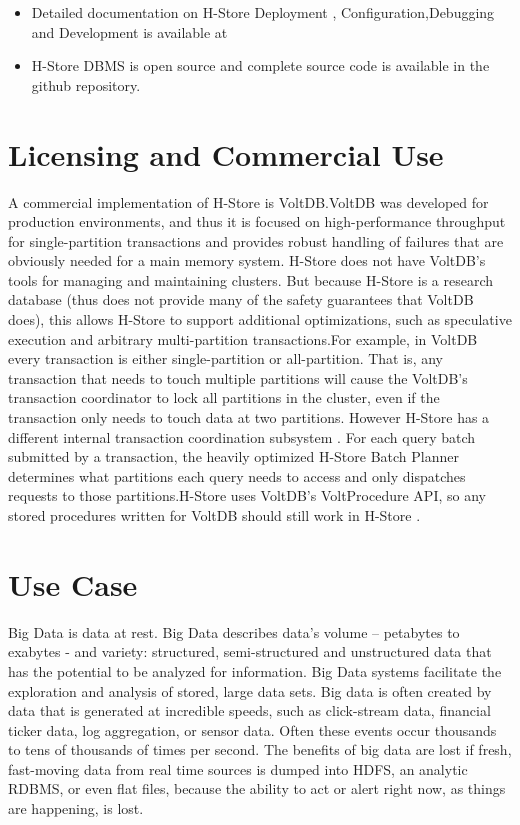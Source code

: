 \documentclass[9pt,twocolumn,twoside]{../../styles/osajnl}
\begin{document}
\begin{itemize}
\renewcommand{\labelitemi}{\scriptsize$\bullet$} 
\item Detailed documentation on H-Store  Deployment , Configuration,Debugging and Development is available at  \cite{www-H-Store}
\item H-Store DBMS is open source and complete source code is available in the  \cite{github-H-Store} github repository. 
\end{itemize}

\section{Licensing and Commercial Use}

A commercial implementation of H-Store is VoltDB.VoltDB was developed for production environments, and thus it is focused on high-performance throughput for single-partition transactions and provides robust handling of failures that are obviously needed for a main memory system. H-Store does not have VoltDB’s tools for managing and maintaining clusters. But because H-Store is a research database (thus does not provide many of the safety guarantees that VoltDB does), this allows H-Store to support additional optimizations, such as speculative execution and arbitrary multi-partition transactions.For example, in VoltDB every transaction is either single-partition or all-partition. That is, any transaction that needs to touch multiple partitions will cause the VoltDB’s transaction coordinator to lock all partitions in the cluster, even if the transaction only needs to touch data at two partitions. However H-Store has a different internal transaction coordination subsystem . For each query batch submitted by a transaction, the heavily optimized H-Store Batch Planner determines what partitions each query needs to access and only dispatches requests to those partitions.H-Store uses VoltDB’s VoltProcedure API, so any stored procedures written for VoltDB should still work in H-Store \cite{www-H-StoreFaq}. 


\section{Use Case}

Big Data is data at rest. Big Data describes data’s volume – petabytes to exabytes - and variety: structured, semi-structured and unstructured data that has the potential to be analyzed for information. Big Data systems facilitate the exploration and analysis of stored, large data sets.
Big data is often created by data that is generated at incredible speeds, such as click-stream data, financial ticker data, log aggregation, or sensor data. Often these events occur thousands to tens of thousands of times per second. The benefits of big data are lost if fresh, fast-moving data from real time sources is dumped into HDFS, an analytic RDBMS, or even flat files, because the ability to act or alert right now, as things are happening, is lost. 
\end{document}
